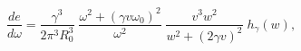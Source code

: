 \begin{equation} \label{hsA} 
\frac{d e}{d\omega}= 
\frac{\gamma ^3}{2\pi ^3 R_{0}^{3}} \; 
\frac{\omega ^2+(\gamma v \omega _{0})^2}{\omega ^2} \; 
\frac{v^3w^2}{w^2+(2\gamma v)^2} \; 
h_{\gamma}(w), 
\end{equation} 
